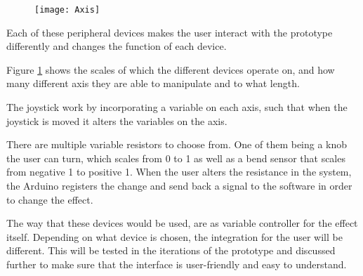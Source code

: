 \begin{figure}[!h] 
\centering
\texttt{[image: Axis]}
\caption{\label{fig:axis}}
\end{figure}



Each of these peripheral devices makes the user interact with the prototype differently and changes the function of each device.

Figure \ref{fig:axis} shows the scales of which the different devices operate on, and how many different axis they are able to manipulate and to what length.
 
The joystick work by incorporating a variable on each axis, such that when the joystick is moved it alters the variables on the axis. 

There are multiple variable resistors to choose from. One of them being a knob the user can turn, which scales from 0 to 1 as well as a bend sensor that scales from negative 1 to positive 1. When the user alters the resistance in the system, the Arduino registers the change and send back a signal to the software in order to change the effect.

The way that these devices would be used, are as variable controller for the effect itself. Depending on what device is chosen, the integration for the user will be different. This will be tested in the iterations of the prototype and discussed further to make sure that the interface is user-friendly and easy to understand. 

